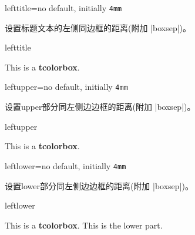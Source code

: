 \begin{docTcbKey}{lefttitle}{=}{no default, initially \texttt{4mm}}

设置标题文本的左侧同边框的距离(附加 |boxsep|)。
\begin{exdispExample}{lefttitle}

\begin{tcolorbox}[lefttitle=3cm,title=My Title]
This is a \textbf{tcolorbox}.
\end{tcolorbox}
\end{exdispExample}
\end{docTcbKey}


\begin{docTcbKey}{leftupper}{=}{no default, initially \texttt{4mm}}

设置upper部分同左侧边边框的距离(附加 |boxsep|)。
\begin{exdispExample}{leftupper}

\begin{tcolorbox}[leftupper=3cm,title=My Title]
This is a \textbf{tcolorbox}.
\end{tcolorbox}
\end{exdispExample}
\end{docTcbKey}

\begin{docTcbKey}{leftlower}{=}{no default, initially \texttt{4mm}}

设置lower部分同左侧边边框的距离(附加 |boxsep|)。
\begin{exdispExample}{leftlower}

\begin{tcolorbox}[leftlower=3cm]
This is a \textbf{tcolorbox}.
\tcblower
This is the lower part.
\end{tcolorbox}
\end{exdispExample}
\end{docTcbKey}

\enlargethispage*{1cm}


